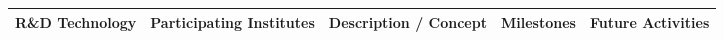 \thispagestyle{empty}
\begin{landscape}
    \centering
    \begin{adjustbox}{max width=1\textwidth,totalheight=1\textheight}
\begin{tabularx}{\textheight}{lXXXX}
    \toprule
    R\&D Technology & Participating Institutes & Description / Concept & Milestones & Future Activities \\
    \midrule
    \bottomrule
\end{tabularx}
\end{adjustbox}
\end{landscape}
\restoregeometry
